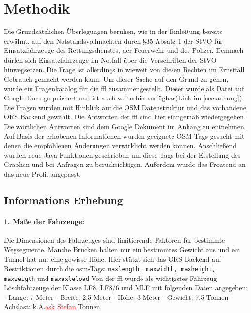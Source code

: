 \documentclass[12pt,a4paper]{article}
\newcommand\todo[1]{\textcolor{red}{#1}}
\begin{document}
\section{Methodik}
Die Grundsätzlichen Überlegungen beruhen, wie in der Einleitung bereits erwähnt, auf den Notstandsvollmachten durch §35 Absatz 1 der StVO für Einsatzfahrzeuge des Rettungsdienstes, der Feuerwehr und der Polizei.
Demnach dürfen sich Einsatzfahrzeuge im Notfall über die Vorschriften der StVO hinwegsetzen. Die Frage ist allerdings in wieweit von diesen Rechten im Ernstfall Gebrauch gemacht werden kann.
Um dieser Sache auf den Grund zu gehen, wurde ein Fragenkatalog für die \gls{ffl} zusammengestellt. Dieser wurde als Datei auf Google Docs gespeichert und ist auch weiterhin verfügbar(Link im \ref{sec:anhang}).
Die Fragen wurden mit Hinblick auf die OSM Datenstruktur und das vorhandene ORS Backend gewählt. Die Antworten der \gls{ffl} sind hier sinngemäß wiedergegeben.
Die wörtlichen Antworten sind dem Google Dokument im Anhang zu entnehmen.
Auf Basis der erhobenen Informationen wurden geeignete OSM-Tags gesucht mit denen die empfohlenen Änderungen verwirklicht werden können. Anschließend wurden neue Java Funktionen geschrieben um diese Tags bei der Erstellung des Graphen und bei Anfragen zu berücksichtigen.
Außerdem wurde das Frontend an das neue Profil angepasst.

\subsection{Informations Erhebung}

\paragraph*{1. Maße der Fahrzeuge:}
\label{frage1}
Die Dimensionen des Fahrzeuges sind limitierende Faktoren für bestimmte Wegsegmente. Manche Brücken halten nur ein bestimmtes Gewicht aus und ein Tunnel hat nur eine gewisse Höhe.
Hier stützt sich das ORS Backend auf Restriktionen durch die \gls{osm}-Tags: \lstinline!maxlength, maxwidth, maxheight, maxweigth! und \lstinline!maxaxleload! Von der \gls{ffl} wurde als wichtigstes Fahrzeug Löschfahrzeuge der Klasse LF8, LF8/6 und MLF mit folgenden Daten angegeben:
- Länge: 7 Meter
- Breite: 2,5 Meter
- Höhe: 3 Meter
- Gewicht: 7,5 Tonnen
- Achslast: k.A.\todo{ask Stefan} Tonnen 
\end{document}
